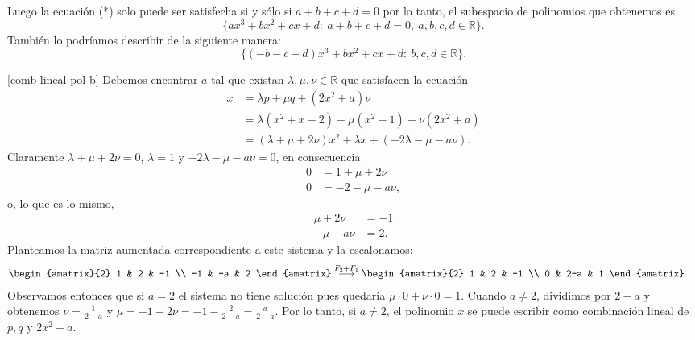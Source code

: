\begin{enumerate}[resume, topsep=6pt, itemsep=.4cm]
    Luego la ecuación (*) solo puede ser satisfecha si y sólo si $a+b+c+d  =0$ por lo tanto, el subespacio de polinomios que obtenemos es
    \begin{equation*}
        \{a x^3 + bx^2 + cx + d: \ a+b+c+d = 0, \ a,b,c,d\in\mathbb{R}\}.
    \end{equation*}
    También lo podríamos describir de la siguiente manera: 
    \begin{equation*}
        \{(-b-c-d) x^3 + bx^2 + cx + d: \ b,c,d\in\mathbb{R}\}.
    \end{equation*}

    \ref{comb-lineal-pol-b} Debemos encontrar $a$ tal que existan $\lambda,\mu,\nu\in\mathbb{R}$ que satisfacen la ecuación
    \begin{align*}
        x&=\lambda p +\mu q +(2x^2+a) \nu \\
        &= \lambda(x^2+x-2)+\mu(x^2-1)+\nu(2x^2+a)\\
        &= (\lambda+\mu+2\nu)x^2+\lambda x+(-2\lambda-\mu-a\nu).
    \end{align*}
    Claramente $\lambda+\mu+2\nu=0$, $\lambda=1$  y $-2\lambda-\mu-a\nu=0$,  en consecuencia
    \begin{align*}
        0&=1+\mu+2\nu\\
        0&=-2-\mu-a\nu,
    \end{align*}
    o, lo que es lo mismo, 
    \begin{align*}
        \mu+2\nu&=-1\\
        -\mu-a\nu&=2.
    \end{align*}
    Planteamos la matriz aumentada correspondiente a este sistema y la escalonamos:
    \begin{align*}
        &\begin{amatrix}{2}
            1 & 2 & -1 \\
            -1 & -a & 2
        \end{amatrix}
        \stackrel{F_2+F_1}{\longrightarrow}
        \begin{amatrix}{2}
            1 & 2 & -1 \\
            0 & 2-a & 1
        \end{amatrix}.
    \end{align*}
    Observamos entonces que si $a=2$ el sistema no tiene solución pues quedaría $\mu \cdot 0 + \nu \cdot 0 = 1$. Cuando $ a \ne 2$, dividimos por $2-a$ y obtenemos $\nu = \frac{1}{2-a}$ y $\mu = -1 - 2\nu = -1 - \frac{2}{2-a} = \frac{a}{2-a}$. Por lo tanto, si $a \ne 2$, el polinomio $x$ se puede escribir como combinación lineal de $p,q$ y $2x^2+a$.  




\end{enumerate}

